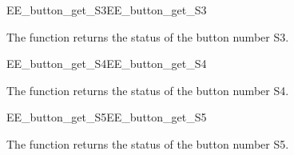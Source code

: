 \begin{function_nopb2}{EE\_button\_get\_S3}{EE_button_get_S3}
  
  \begin{fundescription}
    The function returns the status of the button number S3.
  \end{fundescription}
  
  
  \begin{funreturn}
  \end{funreturn}
  
\end{function_nopb2}

\begin{function_nopb2}{EE\_button\_get\_S4}{EE_button_get_S4}
  
  \begin{fundescription}
    The function returns the status of the button number S4.
  \end{fundescription}
  
  
  \begin{funreturn}
  \end{funreturn}
  
\end{function_nopb2}

\begin{function_nopb2}{EE\_button\_get\_S5}{EE_button_get_S5}
  
  \begin{fundescription}
    The function returns the status of the button number S5.
  \end{fundescription}
  
  
  \begin{funreturn}
  \end{funreturn}
  
\end{function_nopb2}

